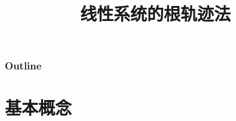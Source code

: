 \documentclass{article}
\title{线性系统的根轨迹法}
\author{}
\date{}
\begin{document}
\maketitle

\begin{frame}
\frametitle{Outline}
\setcounter{tocdepth}{3}
\tableofcontents
\end{frame}













\section{基本概念}
\label{sec-1}
\end{document}
